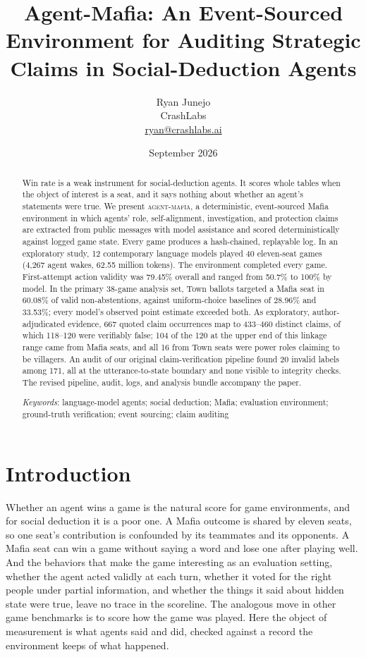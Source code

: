 \documentclass[11pt]{article}
\title{Agent-Mafia: An Event-Sourced Environment for Auditing Strategic Claims in Social-Deduction Agents}
\author{Ryan Junejo\\CrashLabs\\\href{mailto:ryan@crashlabs.ai}{ryan@crashlabs.ai}}
\date{September 2026}
\newcommand{\sys}{\textsc{agent-mafia}}
\begin{document}
\maketitle

\begin{abstract}
\noindent
Win rate is a weak instrument for social-deduction agents. It scores whole tables when the object of interest is a seat, and it says nothing about whether an agent's statements were true. We present \sys, a deterministic, event-sourced Mafia environment in which agents' role, self-alignment, investigation, and protection claims are extracted from public messages with model assistance and scored deterministically against logged game state. Every game produces a hash-chained, replayable log. In an exploratory study, 12 contemporary language models played 40 eleven-seat games (4,267 agent wakes, 62.55 million tokens). The environment completed every game. First-attempt action validity was 79.45\% overall and ranged from 50.7\% to 100\% by model. In the primary 38-game analysis set, Town ballots targeted a Mafia seat in 60.08\% of valid non-abstentions, against uniform-choice baselines of 28.96\% and 33.53\%; every model's observed point estimate exceeded both. As exploratory, author-adjudicated evidence, 667 quoted claim occurrences map to 433--460 distinct claims, of which 118--120 were verifiably false; 104 of the 120 at the upper end of this linkage range came from Mafia seats, and all 16 from Town seats were power roles claiming to be villagers. An audit of our original claim-verification pipeline found 20 invalid labels among 171, all at the utterance-to-state boundary and none visible to integrity checks. The revised pipeline, audit, logs, and analysis bundle accompany the paper.

\vspace{6pt}\noindent\textit{Keywords}: language-model agents; social deduction; Mafia; evaluation environment; ground-truth verification; event sourcing; claim auditing
\end{abstract}

\section{Introduction}
\label{sec:intro}

Whether an agent wins a game is the natural score for game environments, and for social deduction it is a poor one. A Mafia outcome is shared by eleven seats, so one seat's contribution is confounded by its teammates and its opponents. A Mafia seat can win a game without saying a word and lose one after playing well. And the behaviors that make the game interesting as an evaluation setting, whether the agent acted validly at each turn, whether it voted for the right people under partial information, and whether the things it said about hidden state were true, leave no trace in the scoreline. The analogous move in other game benchmarks is to score how the game was played. Here the object of measurement is what agents said and did, checked against a record the environment keeps of what happened.
\end{document}
